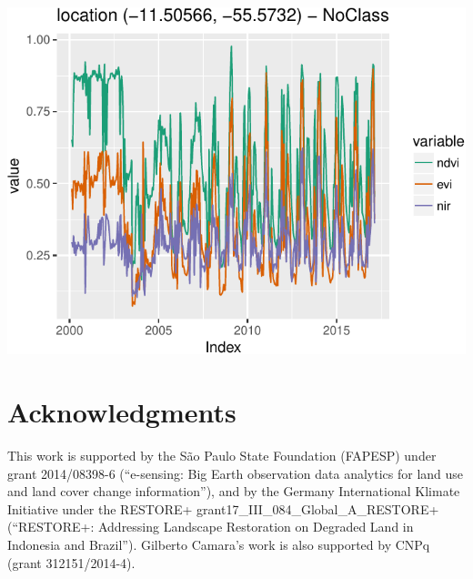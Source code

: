 \documentclass[article]{jss}
\begin{document}
\begin{CodeChunk}
\begin{center}\includegraphics{sits_files/figure-latex/unnamed-chunk-7-1} \end{center}

\end{CodeChunk}

\section*{Acknowledgments}

This work is supported by the São Paulo State Foundation (FAPESP) under
grant 2014/08398-6 (``e-sensing: Big Earth observation data analytics
for land use and land cover change information''), and by the Germany
International Klimate Initiative under the RESTORE+
grant17\_III\_084\_Global\_A\_RESTORE+ (``RESTORE+: Addressing Landscape
Restoration on Degraded Land in Indonesia and Brazil''). Gilberto
Camara's work is also supported by CNPq (grant 312151/2014-4).


\end{document}
